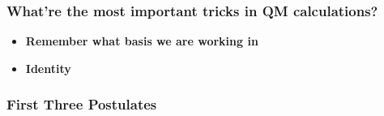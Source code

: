 \documentclass[letterpaper,10pt,english]{sphinxmanual}
\begin{document}
\subsubsection{What're the most important tricks in QM calculations?}
\label{QuantumMechanics:what-re-the-most-important-tricks-in-qm-calculations}\begin{itemize}
\item {} 
\textbf{Remember what basis we are working in}

\item {} 
\textbf{Identity}

\end{itemize}


\subsubsection{First Three Postulates}
\end{document}
